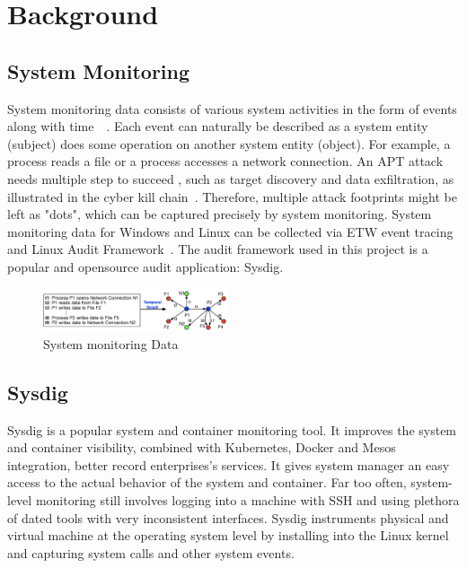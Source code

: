 \section{Background}
\subsection{System Monitoring}
System monitoring data consists of various system activities in the form of events along with time~~\cite{backtracking, backtracking2, taser,wormlog}. Each event can naturally be described as a system entity (subject) does some operation on another system entity (object). For example, a process reads a file or a process accesses a network connection. An APT attack needs multiple step to succeed , such as target discovery and data exfiltration, as illustrated in the cyber kill chain~\cite{killchain}. Therefore, multiple attack footprints might be left as "dots", which can be captured precisely by system monitoring. System monitoring data for Windows and Linux can be collected via ETW event tracing~\cite{etw} and Linux Audit Framework~\cite{auditd}. The audit framework used in this project is a popular and opensource audit application: Sysdig.
\begin{figure}
	\centering
	\includegraphics[width=0.48\textwidth]{temporal-graph.jpg}
	\caption{System monitoring Data}
	\label{fig:temporalGraph}
\end{figure}
\subsection{Sysdig}
Sysdig is a popular system and container monitoring tool. It improves the system and container visibility, combined with Kubernetes, Docker and Mesos integration, better record enterprises's services. It gives system manager an easy access to the actual behavior of the system and container. Far too often, system-level monitoring still involves logging into a machine with SSH and using plethora of dated tools with very inconsistent interfaces. Sysdig instruments physical and virtual machine at the operating system level by installing into the Linux kernel and capturing system calls and other system events.
